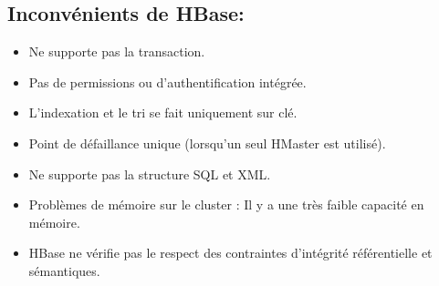 \subsection{Inconvénients de HBase:}

\begin{itemize}[label=\textbullet]

\item Ne supporte pas la transaction.

\item Pas de permissions ou d'authentification intégrée.

\item L'indexation et le tri se fait uniquement sur clé.

\item Point de défaillance unique (lorsqu'un seul HMaster est utilisé).

\item Ne supporte pas la structure SQL et XML.

\item Problèmes de mémoire sur le cluster : Il y a une très faible capacité en mémoire.

\item HBase ne vérifie pas le respect des contraintes d'intégrité référentielle et sémantiques.

\end{itemize}